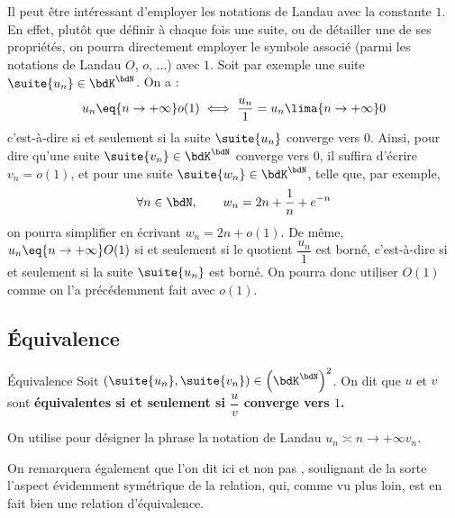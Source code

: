 \documentclass[a4paper,french,bookmarks]{article}
\begin{document}

Il peut être intéressant d'employer les notations de Landau avec la constante $1$. En effet, plutôt que définir à chaque fois une suite, ou de détailler une de ses propriétés, on pourra directement employer le symbole associé (parmi les notations de Landau $O$, $o$, $\dots$) avec $1$. 
Soit par exemple une suite $\suite{u_n} \in \bdK^\bdN$. On a :
\[ u_n \eq{n \to +\infty} o(1) \iff \dfrac{u_n}{1} = u_n \lima{n \to +\infty} 0\] c'est-à-dire si et seulement si la suite $\suite{u_n}$ converge vers $0$. Ainsi, pour dire qu'une suite $\suite{v_n} \in \bdK^\bdN$ converge vers $0$, il suffira d'écrire $v_n = o(1)$, et pour une suite $\suite{w_n} \in \bdK^\bdN$, telle que, par exemple, \[\forall n \in \bdN, \qquad w_n = 2n + \dfrac{1}{n} + e^{-n}\]
on pourra simplifier en écrivant $w_n = 2n + o(1)$. De même, $u_n \eq{n \to +\infty} O(1)$ si et seulement si le quotient $\dfrac{u_n}{1}$ est borné, c'est-à-dire si et seulement si la suite $\suite{u_n}$ est borné. On pourra donc utiliser $O(1)$ comme on l'a précédemment fait avec $o(1)$.

\subsection{Équivalence}
\begin{definition}{Équivalence}{}
    Soit $\left(\suite{u_n}, \suite{v_n}\right) \in \left(\bdK^\bdN\right)^2$. On dit que $u$ et $v$ sont \bf{équivalentes} si et seulement si $\dfrac{u}{v}$ converge vers $1$.
\end{definition}

On utilise pour désigner la phrase  la notation de Landau $u_n \asymp{n \to +\infty} v_n$.

On remarquera également que l'on dit ici  et non pas , soulignant de la sorte l'aspect évidemment symétrique de la relation, qui, comme vu plus loin, est en fait bien une relation d'équivalence.
\end{document}
